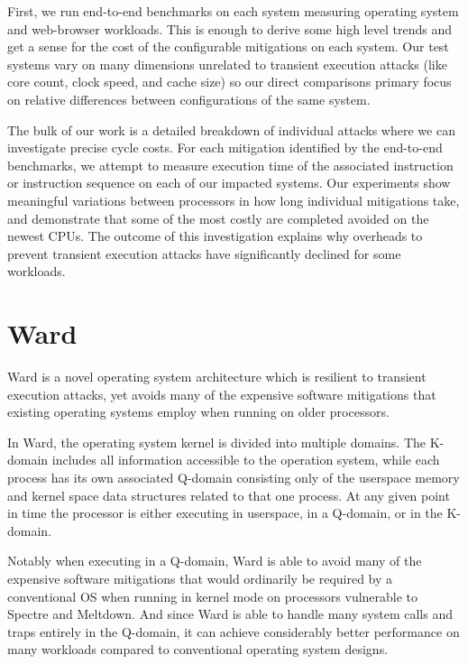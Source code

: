 First, we run end-to-end benchmarks on each system measuring operating system and web-browser workloads.
This is enough to derive some high level trends and get a sense for the cost of the configurable mitigations on each system.
Our test systems vary on many dimensions unrelated to transient execution attacks (like core count, clock speed, and cache size) so our direct comparisons primary focus on relative differences between configurations of the same system.

The bulk of our work is a detailed breakdown of individual attacks where we can investigate precise cycle costs.
For each mitigation identified by the end-to-end benchmarks, we attempt to measure execution time of the associated instruction or instruction sequence on each of our impacted systems.
Our experiments show meaningful variations between processors in how long individual mitigations take, and demonstrate that some of the most costly are completed avoided on the newest CPUs. 
The outcome of this investigation explains why overheads to prevent transient execution attacks have significantly declined for some workloads.

\section{Ward}
Ward is a novel operating system architecture which is resilient to transient execution attacks, yet avoids many of the expensive software mitigations that existing operating systems employ when running on older processors. 

In Ward, the operating system kernel is divided into multiple domains.
The K-domain includes all information accessible to the operation system, while each process has its own associated Q-domain consisting only of the userspace memory and kernel space data structures related to that one process.
At any given point in time the processor is either executing in userspace, in a Q-domain, or in the K-domain. 

Notably when executing in a Q-domain, Ward is able to avoid many of the expensive software mitigations that would ordinarily be required by a conventional OS when running in kernel mode on processors vulnerable to Spectre and Meltdown.
And since Ward is able to handle many system calls and traps entirely in the Q-domain, it can achieve considerably better performance on many workloads compared to conventional operating system designs.


